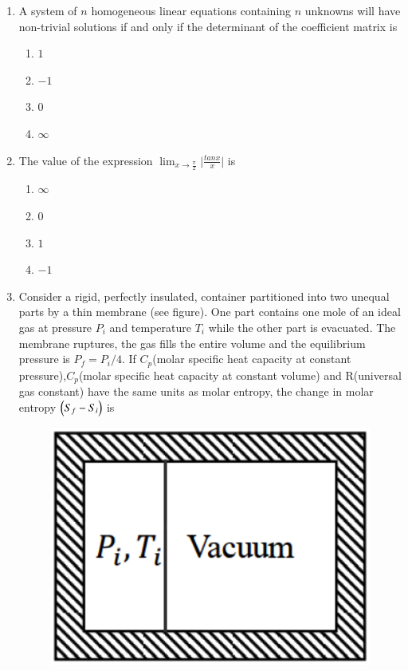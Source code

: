 \documentclass[journal,12pt,onecolumn]{IEEEtran}
\theoremstyle{remark}
\begin{document}
\begin{enumerate}
    \item A system of $n$ homogeneous linear equations containing $n$ unknowns will have non-trivial solutions if and only if the determinant of the coefficient matrix is
    
 \hfill{}
\begin{multicols}{4}
    \begin{enumerate}
        \item $1$
        \item $-1$
        \item $0$
        \item $\infty$
    \end{enumerate}
\end{multicols}

    \item The value of the expression $\lim_{x\to\frac{\pi}{2}}\big|\frac{tan x}{x}\big|$  is
    
 \hfill{}
\begin{multicols}{4}
    \begin{enumerate}
        \item $\infty$
        \item $0$
        \item $1$
        \item $-1$
    \end{enumerate}
\end{multicols}
    \item Consider a rigid, perfectly insulated, container partitioned into two unequal parts by a thin membrane (see figure). One part contains one mole of an ideal gas at pressure {$P_i$} and temperature $T_i$ while the other part is evacuated. The membrane ruptures, the gas fills the entire volume and the equilibrium pressure is $P_f = P_i/4$. If $C_p$(molar specific heat capacity at constant pressure),$C_p$(molar specific heat capacity at constant volume) and R(universal gas constant) have the same units as molar entropy, the change in molar entropy $\left(S_f - S_i\right)$ is
    
 \hfill{}
 \begin{figure}[H]
     \centering
     \includegraphics[width=0.3\linewidth]{Fig/3.png}
     \caption{}
     \label{fig:3}
 \end{figure}


\end{enumerate}
\end{document}
